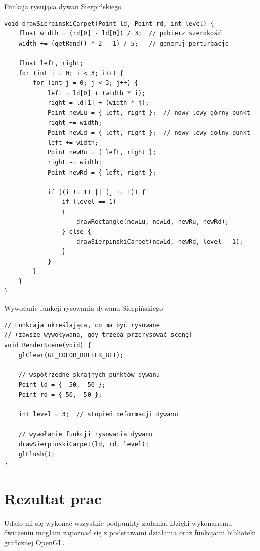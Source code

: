 \documentclass[12pt,a4paper,titlepage]{article}
\begin{document}
\begin{listing}[H]
\caption{Funkcja rysująca dywan Sierpińskiego}
\begin{verbatim}
void drawSierpinskiCarpet(Point ld, Point rd, int level) {
    float width = (rd[0] - ld[0]) / 3;  // pobierz szerokość
    width += (getRand() * 2 - 1) / 5;   // generuj perturbacje
    
    float left, right;
    for (int i = 0; i < 3; i++) {
        for (int j = 0; j < 3; j++) {
            left = ld[0] + (width * i);
            right = ld[1] + (width * j);
            Point newLu = { left, right };  // nowy lewy górny punkt
            right += width;
            Point newLd = { left, right };  // nowy lewy dolny punkt
            left += width;
            Point newRu = { left, right };
            right -= width;
            Point newRd = { left, right };

            if ((i != 1) || (j != 1)) {
                if (level == 1)
                {
                    drawRectangle(newLu, newLd, newRu, newRd);
                } else {
                    drawSierpinskiCarpet(newLd, newRd, level - 1);
                }
            }
        }
    }
}
\end{verbatim}
\end{listing}

\begin{listing}[H]
\caption{Wywołanie funkcji rysowania dywanu Sierpińskiego}
\begin{verbatim}
// Funkcaja określająca, co ma być rysowane
// (zawsze wywoływana, gdy trzeba przerysować scenę)
void RenderScene(void) {
    glClear(GL_COLOR_BUFFER_BIT);
    
    // współrzędne skrajnych punktów dywanu
    Point ld = { -50, -50 };
    Point rd = { 50, -50 };

    int level = 3;  // stopień deformacji dywanu
    
    // wywołanie funkcji rysowania dywanu
    drawSierpinskiCarpet(ld, rd, level);     
    glFlush();
}
\end{verbatim}
\end{listing}
\newpage
\section{Rezultat prac}
Udało mi się wykonać wszystkie podpunkty zadania. Dzięki wykonanemu ćwiczeniu mogłam zapoznać się z podstawami działania oraz funkcjami biblioteki graficznej OpenGL.
\end{document}

